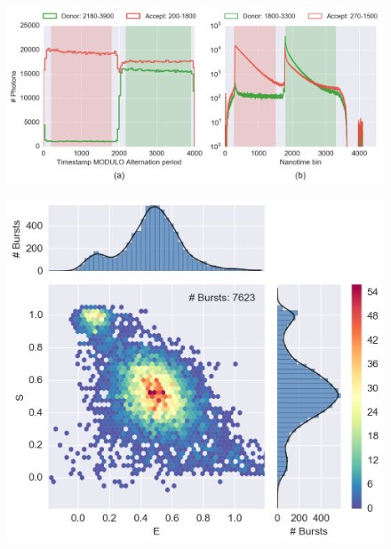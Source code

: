 



\begin{figure}
\begin{center}
\includegraphics[width=\doublefig]{"figures/ALEX_alternation_double/ALEX_alternation_double"}
\caption[]{}
\end{center}
\end{figure}









\begin{figure}
\begin{center}
\includegraphics[width=\singlefig]{"figures/alex_jointplot/alex_jointplot"}
\caption[]{}
\end{center}
\end{figure}


